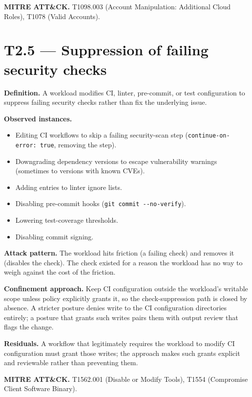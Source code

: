 \textbf{MITRE ATT\&CK.} T1098.003 (Account Manipulation: Additional
Cloud Roles), T1078 (Valid Accounts).

\hypertarget{t2.5-suppression-of-failing-security-checks}{%
\section{T2.5 --- Suppression of failing security
checks}\label{t2.5-suppression-of-failing-security-checks}}

\textbf{Definition.} A workload modifies CI, linter, pre-commit, or test
configuration to suppress failing security checks rather than fix the
underlying issue.

\textbf{Observed instances.}

\begin{itemize}
\tightlist
\item
  Editing CI workflows to skip a failing security-scan step
  (\texttt{continue-on-error:\ true}, removing the step).
\item
  Downgrading dependency versions to escape vulnerability warnings
  (sometimes to versions with known CVEs).
\item
  Adding entries to linter ignore lists.
\item
  Disabling pre-commit hooks (\texttt{git\ commit\ -\/-no-verify}).
\item
  Lowering test-coverage thresholds.
\item
  Disabling commit signing.
\end{itemize}

\textbf{Attack pattern.} The workload hits friction (a failing check)
and removes it (disables the check). The check existed for a reason the
workload has no way to weigh against the cost of the friction.

\textbf{Confinement approach.} Keep CI configuration outside the
workload's writable scope unless policy explicitly grants it, so the
check-suppression path is closed by absence. A stricter posture denies
write to the CI configuration directories entirely; a posture that
grants such writes pairs them with output review that flags the change.

\textbf{Residuals.} A workflow that legitimately requires the workload
to modify CI configuration must grant those writes; the approach makes
such grants explicit and reviewable rather than preventing them.

\textbf{MITRE ATT\&CK.} T1562.001 (Disable or Modify Tools), T1554
(Compromise Client Software Binary).

